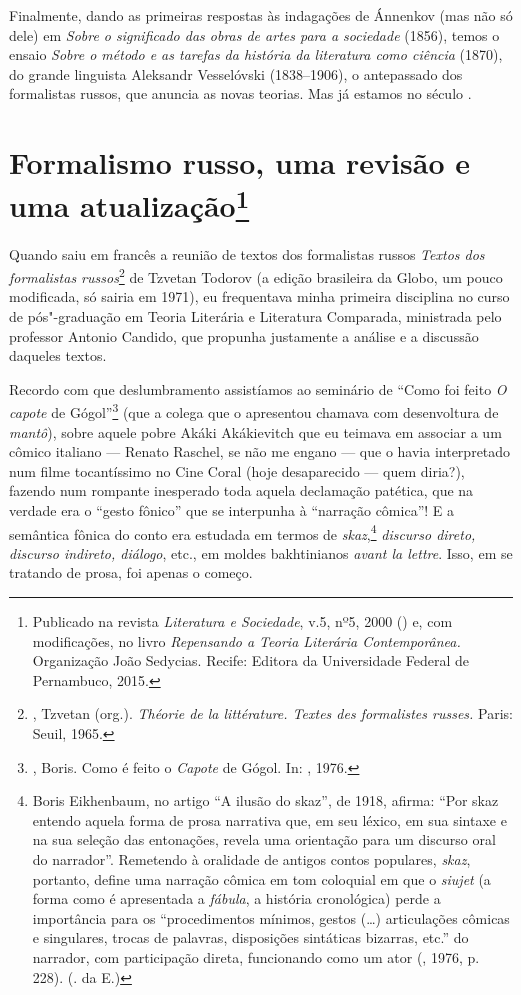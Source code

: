 {Finalmente, dando as primeiras respostas às indagações de Ánnenkov (mas
não só dele) em \emph{Sobre o significado das obras de artes para a sociedade}
(1856), temos o ensaio \emph{Sobre o método e as tarefas da história da
literatura como ciência} (1870), do grande linguista Aleksandr
Vesselóvski (1838--1906), o antepassado dos formalistas russos, que anuncia as novas
teorias. Mas já estamos no século .

\chapter{Formalismo russo, uma revisão e uma atualização\footnote{Publicado na revista \emph{Literatura e Sociedade}, v.5, nº5, 2000 () e, com modificações, no livro \emph{Repensando a Teoria Literária Contemporânea.} Organização João Sedycias. Recife: Editora da Universidade Federal de Pernambuco, 2015.}}

Quando saiu em francês a reunião de textos dos formalistas russos \emph{Textos dos formalistas
russos}\footnote{, 
Tzvetan (org.). \emph{Théorie de la littérature. Textes des 
formalistes russes.} Paris: Seuil, 1965.} de Tzvetan Todorov
(a edição brasileira da Globo, um pouco modificada, só sairia em 1971),
eu frequentava minha primeira disciplina no curso de pós"-graduação em Teoria Literária
e Literatura Comparada, ministrada pelo professor Antonio Candido, que propunha
justamente a análise e a discussão daqueles textos.


 Recordo com que deslumbramento assistíamos ao seminário de
``Como foi feito \emph{O capote} de Gógol''\footnote{, Boris.
 Como é feito o \emph{Capote} de Gógol. In: , 1976.} (que a colega que o
apresentou chamava com desenvoltura de \emph{mantô}), sobre aquele pobre Akáki
Akákievitch que eu teimava em associar a um cômico italiano --- Renato
Raschel, se não me engano --- que o havia interpretado num filme
tocantíssimo no Cine Coral (hoje desaparecido --- quem diria?), fazendo num rompante inesperado toda aquela declamação patética, que na
verdade era o ``gesto fônico'' que se interpunha à ``narração cômica''!
E a semântica fônica do conto era estudada em termos de \emph{skaz},\footnote{Boris Eikhenbaum, no artigo “A ilusão do skaz”,
 de 1918, afirma: ``Por skaz entendo aquela forma de prosa narrativa
 que, em seu léxico, em sua sintaxe e na sua seleção das entonações,
 revela uma orientação para um discurso oral do narrador''. Remetendo
 à oralidade de antigos contos populares, \emph{skaz}, portanto, 
define uma narração cômica em tom coloquial em que o \emph{siujet}
 (a forma como é apresentada a \emph{fábula}, a história cronológica)
 perde a importância para os ``procedimentos mínimos, gestos
 (\ldots{}) articulações cômicas e singulares, trocas de palavras,
 disposições sintáticas bizarras, etc.'' do narrador, com participação 
direta, funcionando como um ator (, 1976, p. 228).
 (. da {E}.)}
\emph{discurso direto, discurso indireto, diálogo}, etc., em moldes bakhtinianos
\emph{avant la lettre}. Isso, em se tratando de prosa, foi apenas o começo.


}
